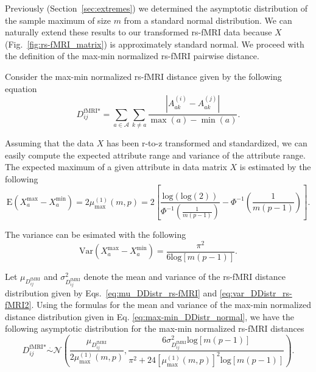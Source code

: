 \documentclass[10pt,letterpaper]{article}
\begin{document}
Previously (Section~\ref{sec:extremes}) we determined the asymptotic distribution of the sample maximum of size $m$ from a standard normal distribution. We can naturally extend these results to our transformed rs-fMRI data because $X$ (Fig.~\ref{fig:rs-fMRI_matrix}) is approximately standard normal. We proceed with the definition of the max-min normalized rs-fMRI pairwise distance.

Consider the max-min normalized rs-fMRI distance given by the following equation
%
\begin{equation}\label{eq:max-min_diff_rs-fMRI}
D^\text{fMRI*}_{ij} = \sum_{a \in \mathcal{A}} \sum_{k \neq a} \frac{\left|A^{(i)}_{ak} - A^{(j)}_{ak}\right|}{\max(a) - \min(a)}.
\end{equation}

Assuming that the data $X$ has been r-to-z transformed and standardized, we can easily compute the expected attribute range and variance of the attribute range. The expected maximum of a given attribute in data matrix $X$ is estimated by the following
%
\begin{equation}\label{eq:mean_max_rs-fMRI}
\text{E}\left(X^\text{max}_a - X^\text{min}_a\right) = 2\mu^{(1)}_\text{max}(m,p) = 2 \left[\frac{\text{log}(\text{log}(2))}{\Phi^{-1}\left(\frac{1}{m(p-1)}\right)} - \Phi^{-1}\left(\frac{1}{m(p-1)}\right)\right].
\end{equation}

The variance can be esimated with the following
%
\begin{equation}\label{eq:var_max_rs-fMRI}
\text{Var}\left(X^\text{max}_a - X^\text{min}_a\right) = \frac{\pi^2}{6\text{log}[m(p-1)]}.
\end{equation}

Let $\mu_{D^\text{fMRI}_{ij}}$ and $\sigma^2_{D^\text{fMRI}_{ij}}$ denote the mean and variance of the rs-fMRI distance distribution given by Eqs.~\ref{eq:mu_DDistr_rs-fMRI} and \ref{eq:var_DDistr_rs-fMRI2}. Using the formulas for the mean and variance of the max-min normalized distance distribution given in Eq. \ref{eq:max-min_DDistr_normal}, we have the following asymptotic distribution for the max-min normalized rs-fMRI distances
%
\begin{equation}\label{eq:max-min_DDistr_normal_rs-fMRI}
D^\text{fMRI*}_{ij} \overset{.}{\sim} \mathcal{N}\left(\frac{\mu_{D^\text{fMRI}_{ij}}}{2\mu^{(1)}_\text{max}(m,p)}, \frac{6\sigma^2_{D^\text{fMRI}_{ij}}\text{log}[m(p-1)]}{\pi^2 + 24\left[\mu^{(1)}_\text{max}(m,p)\right]^2\text{log}[m(p-1)]}\right).
\end{equation}
\end{document}

